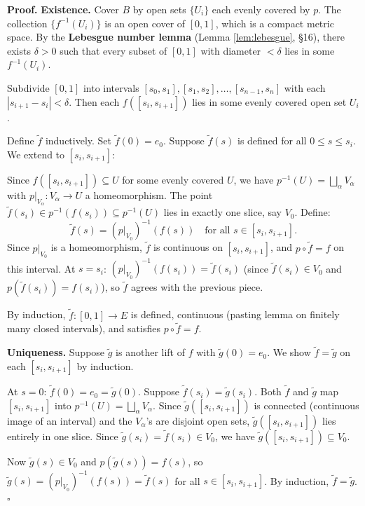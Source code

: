\documentclass[11pt]{report}
\renewenvironment{proof}[1][Proof]{\noindent\textbf{#1.} }{\hfill$\square$\par\vspace{5pt}}
\begin{document}
\begin{proof}
\textbf{Existence.} Cover $B$ by open sets $\{U_i\}$ each evenly covered by $p$. The collection $\{f^{-1}(U_i)\}$ is an open cover of $[0, 1]$, which is a compact metric space. By the \textbf{Lebesgue number lemma} (Lemma \ref{lem:lebesgue}, \S 16), there exists $\delta > 0$ such that every subset of $[0,1]$ with diameter $< \delta$ lies in some $f^{-1}(U_i)$.

Subdivide $[0, 1]$ into intervals $[s_0, s_1], [s_1, s_2], \ldots, [s_{n-1}, s_n]$ with each $|s_{i+1} - s_i| < \delta$. Then each $f([s_i, s_{i+1}])$ lies in some evenly covered open set $U_i$.

Define $\tilde{f}$ inductively. Set $\tilde{f}(0) = e_0$. Suppose $\tilde{f}(s)$ is defined for all $0 \leq s \leq s_i$. We extend to $[s_i, s_{i+1}]$:

Since $f([s_i, s_{i+1}]) \subseteq U$ for some evenly covered $U$, we have $p^{-1}(U) = \bigsqcup_\alpha V_\alpha$ with $p|_{V_\alpha}: V_\alpha \to U$ a homeomorphism. The point $\tilde{f}(s_i) \in p^{-1}(f(s_i)) \subseteq p^{-1}(U)$ lies in exactly one slice, say $V_0$. Define:
\[\tilde{f}(s) = (p|_{V_0})^{-1}(f(s)) \quad \text{for all } s \in [s_i, s_{i+1}].\]
Since $p|_{V_0}$ is a homeomorphism, $\tilde{f}$ is continuous on $[s_i, s_{i+1}]$, and $p \circ \tilde{f} = f$ on this interval. At $s = s_i$: $(p|_{V_0})^{-1}(f(s_i)) = \tilde{f}(s_i)$ (since $\tilde{f}(s_i) \in V_0$ and $p(\tilde{f}(s_i)) = f(s_i)$), so $\tilde{f}$ agrees with the previous piece.

By induction, $\tilde{f}: [0,1] \to E$ is defined, continuous (pasting lemma on finitely many closed intervals), and satisfies $p \circ \tilde{f} = f$.

\textbf{Uniqueness.} Suppose $\tilde{g}$ is another lift of $f$ with $\tilde{g}(0) = e_0$. We show $\tilde{f} = \tilde{g}$ on each $[s_i, s_{i+1}]$ by induction.

At $s = 0$: $\tilde{f}(0) = e_0 = \tilde{g}(0)$. Suppose $\tilde{f}(s_i) = \tilde{g}(s_i)$. Both $\tilde{f}$ and $\tilde{g}$ map $[s_i, s_{i+1}]$ into $p^{-1}(U)= \bigsqcup_\alpha V_\alpha$. Since $\tilde{g}([s_i, s_{i+1}])$ is connected (continuous image of an interval) and the $V_\alpha$'s are disjoint open sets, $\tilde{g}([s_i, s_{i+1}])$ lies entirely in one slice. Since $\tilde{g}(s_i) = \tilde{f}(s_i) \in V_0$, we have $\tilde{g}([s_i, s_{i+1}]) \subseteq V_0$.

Now $\tilde{g}(s) \in V_0$ and $p(\tilde{g}(s)) = f(s)$, so $\tilde{g}(s) = (p|_{V_0})^{-1}(f(s)) = \tilde{f}(s)$ for all $s \in [s_i, s_{i+1}]$. By induction, $\tilde{f} = \tilde{g}$.
\end{proof}
\end{document}
